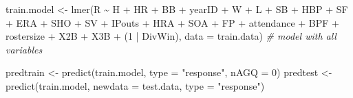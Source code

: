\documentclass[
]{article}
\newenvironment{Shaded}{\begin{snugshade}}{\end{snugshade}}
\newcommand{\AttributeTok}[1]{\textcolor[rgb]{0.77,0.63,0.00}{#1}}
\newcommand{\CommentTok}[1]{\textcolor[rgb]{0.56,0.35,0.01}{\textit{#1}}}
\newcommand{\DecValTok}[1]{\textcolor[rgb]{0.00,0.00,0.81}{#1}}
\newcommand{\FunctionTok}[1]{\textcolor[rgb]{0.00,0.00,0.00}{#1}}
\newcommand{\NormalTok}[1]{#1}
\newcommand{\OtherTok}[1]{\textcolor[rgb]{0.56,0.35,0.01}{#1}}
\newcommand{\SpecialCharTok}[1]{\textcolor[rgb]{0.00,0.00,0.00}{#1}}
\newcommand{\StringTok}[1]{\textcolor[rgb]{0.31,0.60,0.02}{#1}}
\begin{document}
\begin{Shaded}
\begin{Highlighting}[]
\NormalTok{train.model }\OtherTok{\textless{}{-}} \FunctionTok{lmer}\NormalTok{(R }\SpecialCharTok{\textasciitilde{}}\NormalTok{ H }\SpecialCharTok{+}\NormalTok{ HR }\SpecialCharTok{+}\NormalTok{ BB }\SpecialCharTok{+}\NormalTok{ yearID }\SpecialCharTok{+}\NormalTok{ W }\SpecialCharTok{+}\NormalTok{ L }\SpecialCharTok{+}\NormalTok{ SB }\SpecialCharTok{+}\NormalTok{ HBP }\SpecialCharTok{+}\NormalTok{ SF }\SpecialCharTok{+}\NormalTok{ ERA }\SpecialCharTok{+}\NormalTok{ SHO }\SpecialCharTok{+}\NormalTok{ SV }\SpecialCharTok{+}\NormalTok{ IPouts }\SpecialCharTok{+}\NormalTok{ HRA }\SpecialCharTok{+}\NormalTok{ SOA }\SpecialCharTok{+}\NormalTok{ FP }\SpecialCharTok{+}\NormalTok{ attendance }\SpecialCharTok{+}\NormalTok{ BPF }\SpecialCharTok{+}\NormalTok{ rostersize }\SpecialCharTok{+}\NormalTok{ X2B }\SpecialCharTok{+}\NormalTok{ X3B }\SpecialCharTok{+}\NormalTok{ (}\DecValTok{1} \SpecialCharTok{|}\NormalTok{ DivWin), }\AttributeTok{data =}\NormalTok{ train.data) }\CommentTok{\# model with all variables}
\end{Highlighting}
\end{Shaded}

\begin{Shaded}
\begin{Highlighting}[]
\NormalTok{predtrain }\OtherTok{\textless{}{-}} \FunctionTok{predict}\NormalTok{(train.model, }\AttributeTok{type =} \StringTok{"response"}\NormalTok{, }\AttributeTok{nAGQ =} \DecValTok{0}\NormalTok{)}
\NormalTok{predtest }\OtherTok{\textless{}{-}} \FunctionTok{predict}\NormalTok{(train.model, }\AttributeTok{newdata =}\NormalTok{ test.data, }\AttributeTok{type =} \StringTok{"response"}\NormalTok{)}
\end{Highlighting}
\end{Shaded}

\begin{Shaded}
\end{Shaded}
\end{document}
